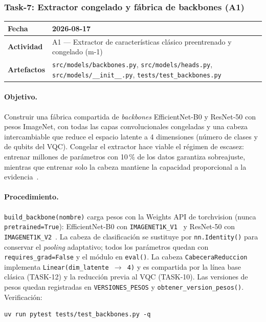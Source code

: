 

\subsubsection{Task-7: Extractor congelado y fábrica de backbones (A1)}
\label{hallazgo:task-7}
\begin{tabularx}{\textwidth}{|l|X|}\hline
\textbf{Fecha} & 2026-08-17 \\\hline
\textbf{Actividad} & A1 --- Extractor de características clásico preentrenado y congelado (m-1) \\\hline
\textbf{Artefactos} & \texttt{src/models/backbones.py}, \texttt{src/models/heads.py}, \texttt{src/models/\_\_init\_\_.py}, \texttt{tests/test\_backbones.py} \\\hline
\end{tabularx}

\paragraph{Objetivo.}
Construir una fábrica compartida de \textit{backbones} EfficientNet-B0 y ResNet-50 con
pesos ImageNet, con todas las capas convolucionales congeladas y una cabeza intercambiable
que reduce el espacio latente a 4 dimensiones (número de clases y de qubits del VQC).
Congelar el extractor hace viable el régimen de escasez: entrenar millones de parámetros
con 10\,\% de los datos garantiza sobreajuste, mientras que entrenar solo la cabeza mantiene
la capacidad proporcional a la evidencia~\cite{mari2020transfer}.

\paragraph{Procedimiento.}
\texttt{build\_backbone(nombre)} carga pesos con la Weights API de torchvision (nunca
\texttt{pretrained=True}): EfficientNet-B0 con \texttt{IMAGENET1K\_V1}~\cite{tan2019efficientnet}
y ResNet-50 con \texttt{IMAGENET1K\_V2}~\cite{he2016deep}. La cabeza de clasificación se
sustituye por \texttt{nn.Identity()} para conservar el \textit{pooling} adaptativo; todos
los parámetros quedan con \texttt{requires\_grad=False} y el módulo en \texttt{eval()}.
La cabeza \texttt{CabeceraReduccion} implementa \texttt{Linear(dim\_latente $\rightarrow$ 4)}
y es compartida por la línea base clásica (TASK-12) y la reducción previa al VQC (TASK-10).
Las versiones de pesos quedan registradas en \texttt{VERSIONES\_PESOS} y
\texttt{obtener\_version\_pesos()}. Verificación:
\begin{verbatim}
uv run pytest tests/test_backbones.py -q
\end{verbatim}

